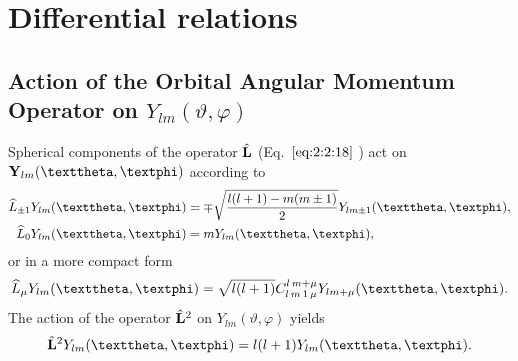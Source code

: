 \section{Differential relations}\label{sec:5.8}
\subsection{Action of the Orbital Angular Momentum  Operator on $Y_{l m}(\vartheta, \varphi)$}\label{sec:5.8.1}
Spherical components of the operator $\hat{\mathbf{L}}$ (Eq.~$\eqref{eq:2:2:18}$ ) act on $\vect{Y}_{l m}(\vartheta, \varphi)$ according to
\begin{align}
\widehat{L}_{ \pm 1} Y_{l m}(\vartheta, \varphi) & =\mp \sqrt{\frac{l(l+1)-m(m \pm 1)}{2}} Y_{l m \pm 1}(\vartheta, \varphi),  \label{eq:5:8:1}\\
\widehat{L}_{0} Y_{l m}(\vartheta, \varphi) & =m Y_{l m}(\vartheta, \varphi), \notag
\end{align}
or in a more compact form
\begin{equation}
\widehat{L}_{\mu} Y_{l m}(\vartheta, \varphi)=\sqrt{l(l+1)} \clebsch{l}{m}{1}{\mu}{l}{m+\mu} Y_{l m+\mu}(\vartheta, \varphi). \label{eq:5:8:2}
\end{equation}
The action of the operator $\hat{\mathbf{L}}^{2}$ on $Y_{l m}(\vartheta, \varphi)$ yields
\begin{equation}
\hat{\vect{L}}^{2} Y_{l m}(\vartheta, \varphi)=l(l+1) Y_{l m}(\vartheta, \varphi). \label{eq:5:8:3}
\end{equation}
